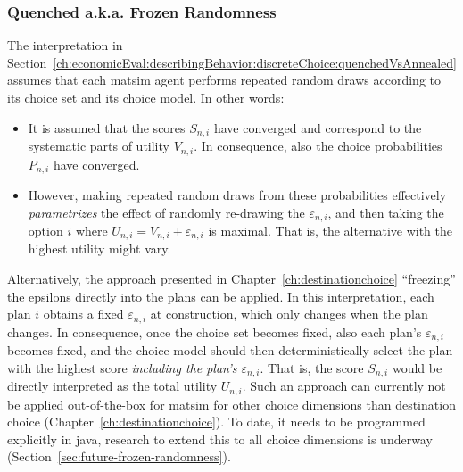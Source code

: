 \subsubsection{Quenched a.k.a. Frozen Randomness}
\label{sec:frozen-randomness}
%
%
The interpretation in Section~\ref{ch:economicEval:describingBehavior:discreteChoice:quenchedVsAnnealed} assumes that each \acrshort{matsim} agent performs repeated random draws according to its choice set and its choice model. 
%
In other words:
%
\begin{itemize}\styleItemize
\item It is assumed that the scores $S_{n,i}$ have converged and correspond to the systematic parts of utility $V_{n,i}$. In consequence, also the choice probabilities $P_{n,i}$ have converged.
%
\item However, making repeated random draws from these probabilities effectively \emph{parametrizes} the effect of randomly re-drawing the $\varepsilon_{n,i}$, and then taking the option $i$ where $U_{n,i} = V_{n,i} + \varepsilon_{n,i}$ is maximal. That is, the alternative with the highest utility might vary.
\end{itemize}
%

Alternatively, the approach presented in Chapter~\ref{ch:destinationchoice} ``freezing'' the epsilons directly into the plans can be applied.  
In this interpretation, each plan $i$ obtains a fixed $\varepsilon_{n,i}$ at construction, which only changes when the plan changes. 
In consequence, once the choice set becomes fixed, also each plan's $\varepsilon_{n,i}$ becomes fixed, and the choice model should then deterministically select the plan with the highest score \emph{including the plan's $\varepsilon_{n,i}$}.
%
That is, the score $S_{n,i}$ would be directly interpreted as the total utility $U_{n,i}$.
%
Such an approach can currently not be applied out-of-the-box for \acrshort{matsim} for other choice dimensions than destination choice (Chapter~\ref{ch:destinationchoice}).
To date, it needs to be programmed explicitly in \gls{java}, research to extend this to all choice dimensions is underway (Section~\ref{sec:future-frozen-randomness}). 

